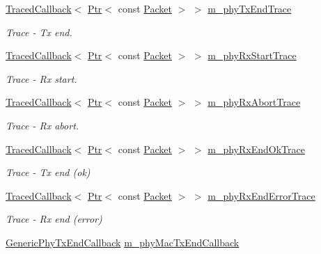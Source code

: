 \begin{DoxyCompactItemize}
\hyperlink{classns3_1_1TracedCallback}{Traced\+Callback}$<$ \hyperlink{classns3_1_1Ptr}{Ptr}$<$ const \hyperlink{classns3_1_1Packet}{Packet} $>$ $>$ \hyperlink{classns3_1_1HalfDuplexIdealPhy_af3d6bb6dbc089478104c50415d6e1faa}{m\+\_\+phy\+Tx\+End\+Trace}
\begin{DoxyCompactList}\small\item\em Trace -\/ Tx end. \end{DoxyCompactList}\item 
\hyperlink{classns3_1_1TracedCallback}{Traced\+Callback}$<$ \hyperlink{classns3_1_1Ptr}{Ptr}$<$ const \hyperlink{classns3_1_1Packet}{Packet} $>$ $>$ \hyperlink{classns3_1_1HalfDuplexIdealPhy_a478247db0193dac5342a70e56384b7c2}{m\+\_\+phy\+Rx\+Start\+Trace}
\begin{DoxyCompactList}\small\item\em Trace -\/ Rx start. \end{DoxyCompactList}\item 
\hyperlink{classns3_1_1TracedCallback}{Traced\+Callback}$<$ \hyperlink{classns3_1_1Ptr}{Ptr}$<$ const \hyperlink{classns3_1_1Packet}{Packet} $>$ $>$ \hyperlink{classns3_1_1HalfDuplexIdealPhy_a60890ab4359c041d13754579f2097a0a}{m\+\_\+phy\+Rx\+Abort\+Trace}
\begin{DoxyCompactList}\small\item\em Trace -\/ Rx abort. \end{DoxyCompactList}\item 
\hyperlink{classns3_1_1TracedCallback}{Traced\+Callback}$<$ \hyperlink{classns3_1_1Ptr}{Ptr}$<$ const \hyperlink{classns3_1_1Packet}{Packet} $>$ $>$ \hyperlink{classns3_1_1HalfDuplexIdealPhy_a09842e876c28267a8e0570bc0da4cdf3}{m\+\_\+phy\+Rx\+End\+Ok\+Trace}
\begin{DoxyCompactList}\small\item\em Trace -\/ Tx end (ok) \end{DoxyCompactList}\item 
\hyperlink{classns3_1_1TracedCallback}{Traced\+Callback}$<$ \hyperlink{classns3_1_1Ptr}{Ptr}$<$ const \hyperlink{classns3_1_1Packet}{Packet} $>$ $>$ \hyperlink{classns3_1_1HalfDuplexIdealPhy_ac36958ef933f0075d040e7ea349f3352}{m\+\_\+phy\+Rx\+End\+Error\+Trace}
\begin{DoxyCompactList}\small\item\em Trace -\/ Rx end (error) \end{DoxyCompactList}\item 
\hyperlink{namespacens3_abe7bae5316e52e374e3cdcdaffe585fa}{Generic\+Phy\+Tx\+End\+Callback} \hyperlink{classns3_1_1HalfDuplexIdealPhy_a183edd1d401edee88591a819f52f9679}{m\+\_\+phy\+Mac\+Tx\+End\+Callback}

\end{DoxyCompactItemize}
